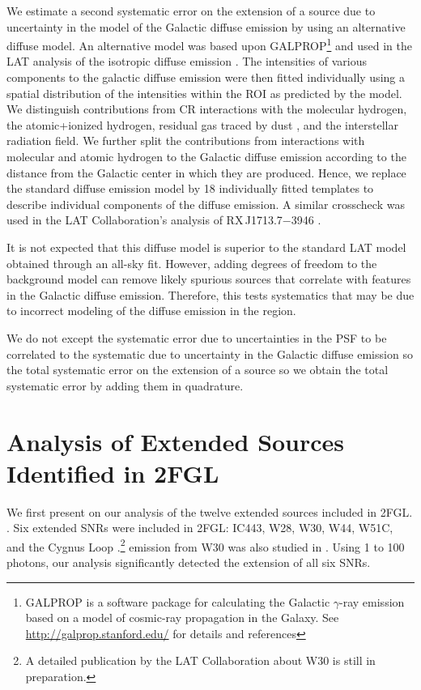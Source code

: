 \documentclass[12pt,preprint]{aastex}
\newcommand{\gev}{\text{GeV}\xspace}
\begin{document}

We estimate a second systematic error on the extension of a source
due to uncertainty in the model of the Galactic diffuse emission by
using an alternative diffuse model. An alternative model was based
upon GALPROP\footnote{GALPROP is a software package for calculating the
Galactic $\gamma$-ray emission based on a model of cosmic-ray propagation
in the Galaxy. See \url{http://galprop.stanford.edu/} for details
and references} and used in the LAT analysis of the isotropic diffuse
emission \citep{isotropic_lat}.  The intensities of various components
to the galactic diffuse emission were then fitted individually using a
spatial distribution of the intensities within the ROI as predicted by
the model.  We distinguish contributions from CR interactions with the
molecular hydrogen, the atomic+ionized hydrogen, residual gas traced
by dust \citep{isabelle_dark_gass}, and the interstellar radiation
field. We further split the contributions from interactions with molecular
and atomic hydrogen to the Galactic diffuse emission according to the
distance from the Galactic center in which they are produced. Hence, we
replace the standard diffuse emission model by 18 individually fitted
templates to describe individual components of the diffuse emission.
A similar crosscheck was used in the LAT Collaboration's analysis of 
RX\,J1713.7$-$3946 \citep{rx_j1713_lat}.

It is not expected that this diffuse model is superior to the standard
LAT model obtained through an all-sky fit.  However, adding degrees of freedom to the background model can
remove likely spurious sources that correlate with features in the
Galactic diffuse emission.  Therefore, this tests systematics that may
be due to incorrect modeling of the diffuse emission in the region.

We do not except the systematic error due to uncertainties in the PSF to
be correlated to the systematic due to uncertainty in the Galactic diffuse
emission so the total systematic error on the extension of a source so
we obtain the total systematic error by adding them in quadrature.

\section{Analysis of Extended Sources Identified in 2FGL}
\label{validate_known}


We first present on our analysis of the twelve extended sources
included in 2FGL.
\citep{second_cat}.
Six extended SNRs were included in 2FGL: IC443, W28, W30, W44, W51C, and the
Cygnus Loop \citep{ic443,w28,w44,w51c,cygnus_loop_lat}.\footnote{A
detailed publication by the LAT
Collaboration about W30 is still in preparation.}
\gev emission from W30 was also studied in \cite{castro_and_slane_2010}.
Using 1 \gev to 100 \gev photons, our analysis significantly detected the
extension of all six SNRs.
\end{document}
